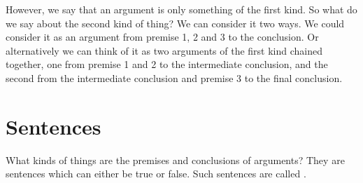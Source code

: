 However, we say that an argument is only something of the first kind. So what do we say about the second kind of thing? We can consider it two ways. We could consider it as an argument from premise 1, 2 and 3 to the conclusion. Or alternatively we can think of it as two arguments of the first kind chained together, one from premise 1 and 2 to the intermediate conclusion, and the second from the intermediate conclusion and premise 3 to the final conclusion.


%
%


\section{Sentences}
\label{intro:sentences}
What kinds of things are the premises and conclusions of arguments? They are sentences which can either be true or false.
Such sentences are called .

